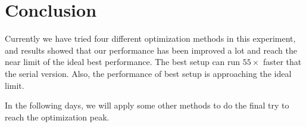\documentclass[12pt]{article}
\begin{document}
\section{Conclusion}
Currently we have tried four different optimization methods in this experiment, 
and results showed that our performance has been improved a lot and reach the 
near limit of the ideal best performance. The best setup can run $55\times$ 
faster that the serial version. Also, the performance of best setup is
approaching the ideal limit.

In the following days, we will apply some other methods to do the final try
to reach the optimization peak.
\end{document}
